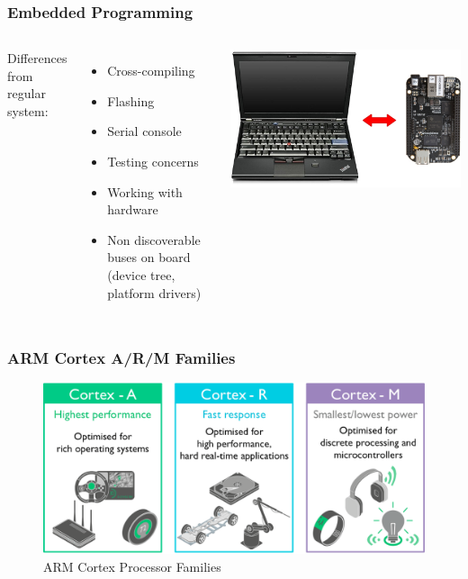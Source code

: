 \documentclass[aspectratio=169]{beamer}
\begin{document}
\begin{frame}
  \frametitle{Embedded Programming}
  \begin{columns}
      Differences from regular system:
      \begin{itemize}
        \item Cross-compiling
        \item Flashing
        \item Serial console
        \item Testing concerns
        \item Working with hardware
        \item Non discoverable buses on board (device tree, platform drivers)
      \end{itemize}
      \includegraphics[scale=0.27]{images/host-target.jpg}
  \end{columns}
\end{frame}

\begin{frame}
  \frametitle{ARM Cortex A/R/M Families}
  \begin{figure}
    \centering
    \includegraphics[scale=0.3]{images/cortex-families.png}
    \caption{ARM Cortex Processor Families}
  \end{figure}
\end{frame}
\end{document}
